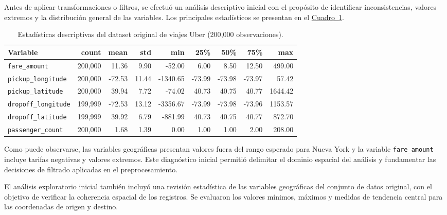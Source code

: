 \documentclass[10pt]{article}
\newcommand{\cuadroref}[1]{\hyperref[#1]{Cuadro~\ref*{#1}}}
\begin{document}
	Antes de aplicar transformaciones o filtros, se efectuó un análisis descriptivo inicial con el propósito de identificar inconsistencias, valores extremos y la distribución general de las variables. Los principales estadísticos se presentan en el \cuadroref{tab:estadisticas_iniciales}.

	\begin{table}[!htbp]
		\centering
		\caption{Estadísticas descriptivas del dataset original de viajes Uber (200{,}000 observaciones).}
		\label{tab:estadisticas_iniciales}
		\begin{adjustbox}{max width=0.95\textwidth,center}
			\begin{tabular}{lrrrrrrrr}
				\hline
				\textbf{Variable} & \textbf{count} & \textbf{mean} & \textbf{std} & \textbf{min} & \textbf{25\%} & \textbf{50\%} & \textbf{75\%} & \textbf{max} \\
				\hline
				\texttt{fare\_amount} & 200{,}000 & 11.36 & 9.90 & -52.00 & 6.00 & 8.50 & 12.50 & 499.00 \\
				\texttt{pickup\_longitude} & 200{,}000 & -72.53 & 11.44 & -1340.65 & -73.99 & -73.98 & -73.97 & 57.42 \\
				\texttt{pickup\_latitude} & 200{,}000 & 39.94 & 7.72 & -74.02 & 40.73 & 40.75 & 40.77 & 1644.42 \\
				\texttt{dropoff\_longitude} & 199{,}999 & -72.53 & 13.12 & -3356.67 & -73.99 & -73.98 & -73.96 & 1153.57 \\
				\texttt{dropoff\_latitude} & 199{,}999 & 39.92 & 6.79 & -881.99 & 40.73 & 40.75 & 40.77 & 872.70 \\
				\texttt{passenger\_count} & 200{,}000 & 1.68 & 1.39 & 0.00 & 1.00 & 1.00 & 2.00 & 208.00 \\
				\hline
			\end{tabular}
		\end{adjustbox}
	\end{table}

	Como puede observarse, las variables geográficas presentan valores fuera del rango esperado para Nueva York y la variable \texttt{fare\_amount} incluye tarifas negativas y valores extremos. Este diagnóstico inicial permitió delimitar el dominio espacial del análisis y fundamentar las decisiones de filtrado aplicadas en el preprocesamiento.

	El análisis exploratorio inicial también incluyó una revisión estadística de las variables geográficas del conjunto de datos original, con el objetivo de verificar la coherencia espacial de los registros. Se evaluaron los valores mínimos, máximos y medidas de tendencia central para las coordenadas de origen y destino.
\end{document}
